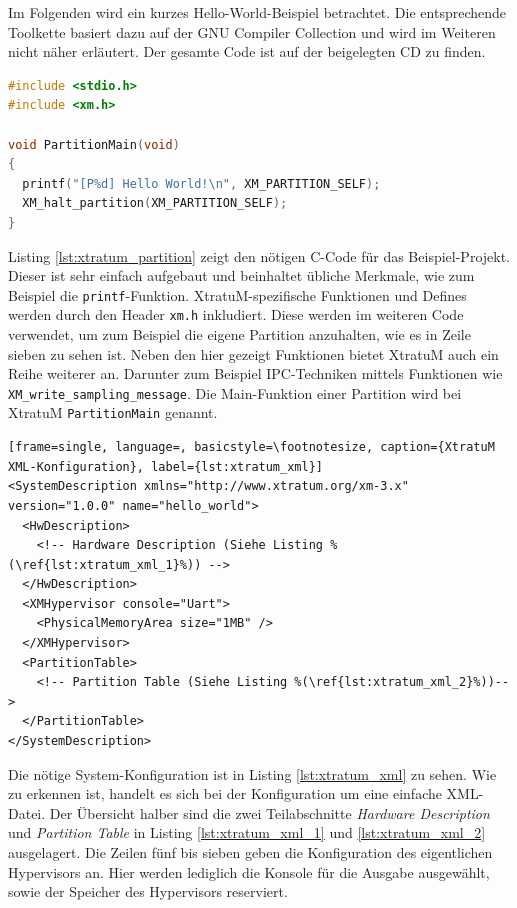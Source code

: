 \documentclass[
  a4paper,					    %
  twoside,
  DIV=calc,     				%
  bibliography=totoc,
  cleardoublepage=empty,
  ngerman,     					%
  final       					%
]{scrbook}
\begin{document}
Im Folgenden wird ein kurzes Hello-World-Beispiel betrachtet. Die entsprechende Toolkette basiert dazu auf der GNU Compiler Collection und wird im Weiteren nicht näher erläutert. Der gesamte Code ist auf der beigelegten CD zu finden. 

\begin{lstlisting}[frame=single, language=C, basicstyle=\footnotesize, caption={XtratuM Beispiel Partition}, label={lst:xtratum_partition}]
#include <stdio.h>
#include <xm.h>

void PartitionMain(void)
{
  printf("[P%d] Hello World!\n", XM_PARTITION_SELF);
  XM_halt_partition(XM_PARTITION_SELF);
}
\end{lstlisting}

Listing \ref{lst:xtratum_partition} zeigt den nötigen C-Code für das Beispiel-Projekt. Dieser ist sehr einfach aufgebaut und beinhaltet übliche Merkmale, wie zum Beispiel die \texttt{printf}-Funktion. XtratuM-spezifische Funktionen und Defines werden durch den Header \texttt{xm.h} inkludiert. Diese werden im weiteren Code verwendet, um zum Beispiel die eigene Partition anzuhalten, wie es in Zeile sieben zu sehen ist. Neben den hier gezeigt Funktionen bietet XtratuM auch ein Reihe weiterer an. Darunter zum Beispiel IPC-Techniken mittels Funktionen wie \texttt{XM\_write\_sampling\_message}. Die Main-Funktion einer Partition wird bei XtratuM \texttt{PartitionMain} genannt.

\begin{lstlisting}[frame=single, language=, basicstyle=\footnotesize, caption={XtratuM XML-Konfiguration}, label={lst:xtratum_xml}]
<SystemDescription xmlns="http://www.xtratum.org/xm-3.x" version="1.0.0" name="hello_world">
  <HwDescription>
    <!-- Hardware Description (Siehe Listing %(\ref{lst:xtratum_xml_1}%)) -->
  </HwDescription>
  <XMHypervisor console="Uart">
    <PhysicalMemoryArea size="1MB" />
  </XMHypervisor>
  <PartitionTable>
    <!-- Partition Table (Siehe Listing %(\ref{lst:xtratum_xml_2}%))-->
  </PartitionTable>
</SystemDescription>
\end{lstlisting}

Die nötige System-Konfiguration ist in Listing \ref{lst:xtratum_xml} zu sehen. Wie zu erkennen ist, handelt es sich bei der Konfiguration um eine einfache XML-Datei. Der Übersicht halber sind die zwei Teilabschnitte \emph{Hardware Description} und \emph{Partition Table} in Listing \ref{lst:xtratum_xml_1} und \ref{lst:xtratum_xml_2} ausgelagert. Die Zeilen fünf bis sieben geben die Konfiguration des eigentlichen Hypervisors an. Hier werden lediglich die Konsole für die Ausgabe ausgewählt, sowie der Speicher des Hypervisors reserviert.
\end{document}
